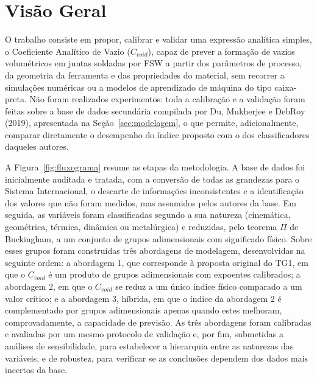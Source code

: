 \documentclass[12pt,openany]{report}
\begin{document}
\section{Visão Geral}
\label{sec:visao_geral}

O trabalho consiste em propor, calibrar e validar uma expressão analítica simples, o Coeficiente Analítico de Vazio ($C_{void}$), capaz de prever a formação de vazios volumétricos em juntas soldadas por FSW a partir dos parâmetros de processo, da geometria da ferramenta e das propriedades do material, sem recorrer a simulações numéricas ou a modelos de aprendizado de máquina do tipo caixa-preta. Não foram realizados experimentos: toda a calibração e a validação foram feitas sobre a base de dados secundária compilada por Du, Mukherjee e DebRoy (2019), apresentada na Seção~\ref{sec:modelagem}, o que permite, adicionalmente, comparar diretamente o desempenho do índice proposto com o dos classificadores daqueles autores.

A Figura~\ref{fig:fluxograma} resume as etapas da metodologia. A base de dados foi inicialmente auditada e tratada, com a conversão de todas as grandezas para o Sistema Internacional, o descarte de informações inconsistentes e a identificação dos valores que não foram medidos, mas assumidos pelos autores da base. Em seguida, as variáveis foram classificadas segundo a sua natureza (cinemática, geométrica, térmica, dinâmica ou metalúrgica) e reduzidas, pelo teorema $\Pi$ de Buckingham, a um conjunto de grupos adimensionais com significado físico. Sobre esses grupos foram construídas três abordagens de modelagem, desenvolvidas na seguinte ordem: a abordagem 1, que corresponde à proposta original do TG1, em que o $C_{void}$ é um produto de grupos adimensionais com expoentes calibrados; a abordagem 2, em que o $C_{void}$ se reduz a um único índice físico comparado a um valor crítico; e a abordagem 3, híbrida, em que o índice da abordagem 2 é complementado por grupos adimensionais apenas quando estes melhoram, comprovadamente, a capacidade de previsão. As três abordagens foram calibradas e avaliadas por um mesmo protocolo de validação e, por fim, submetidas a análises de sensibilidade, para estabelecer a hierarquia entre as naturezas das variáveis, e de robustez, para verificar se as conclusões dependem dos dados mais incertos da base.
\end{document}
